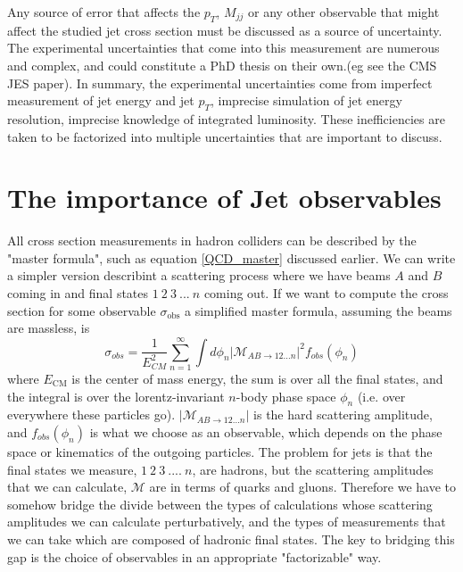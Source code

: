 Any source of error that affects the $p_T$, $M_{jj}$ or any other observable that might affect the studied jet cross section must be discussed as a source of uncertainty. The experimental uncertainties that come into this measurement are numerous and complex, and could constitute a PhD thesis on their own.(eg see the CMS JES paper). In summary, the experimental uncertainties come from imperfect measurement of jet energy and jet $p_T$, imprecise simulation of jet energy resolution, imprecise knowledge of integrated luminosity. These inefficiencies are taken to be factorized into multiple uncertainties that are important to discuss.


\section{The importance of Jet observables }
All cross section measurements in hadron colliders can be described by the "master formula", such as equation \ref{QCD_master} discussed earlier. We can write a simpler version describint a scattering process where we have beams $A$ and $B$ coming in and final states $1\ 2\ 3\ ... \ n$ coming out. If we want to compute the cross section for some observable $\sigma_{\text{obs}}$ a simplified master formula, assuming the beams are massless, is
\begin{equation}
    \sigma_{o b s}=\frac{1}{E_{C M}^{2}} \sum_{n=1}^{\infty} \int d \phi_{n}\left|\mathcal{M}_{A B \rightarrow 12 \ldots n}\right|^{2} f_{o b s}\left(\phi_{n}\right)
\end{equation}
where $E_{\text{CM}}$ is the center of mass energy, the sum is over all the final states, and the integral is over the lorentz-invariant $n$-body phase space $\phi_n$ (i.e. over everywhere these particles go). $\left|\mathcal{M}_{A B \rightarrow 12 \ldots n}\right|$ is the hard scattering amplitude, and $f_{o b s}\left(\phi_{n}\right)$ is what we choose as an observable, which depends on the phase space or kinematics of the outgoing particles. The problem for jets is that the final states we measure, $1\ 2\ 3\ .... \ n$, are hadrons, but the scattering amplitudes that we can calculate, $\mathcal{M}$ are in terms of quarks and gluons. Therefore we have to somehow bridge the divide between the types of calculations whose scattering amplitudes we can calculate perturbatively, and the types of measurements that we can take which are composed of hadronic final states. The key to bridging this gap is the choice of observables in an appropriate "factorizable" way.








